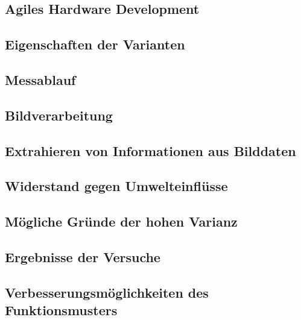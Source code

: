 \documentclass[a4paper,12pt]{article}
\begin{document}
\subsection{Agiles Hardware Development}


\subsection{Eigenschaften der Varianten}


\subsection{Messablauf}


\subsection{Bildverarbeitung}


\subsection{Extrahieren von Informationen aus Bilddaten}


\subsection{Widerstand gegen Umwelteinflüsse}


\subsection{Mögliche Gründe der hohen Varianz}


\subsection{Ergebnisse der Versuche}


%

\subsection{Verbesserungsmöglichkeiten des Funktionsmusters}

\end{document}
